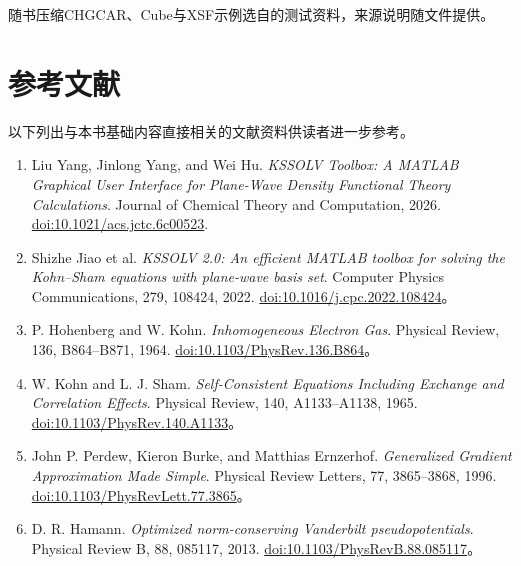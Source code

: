 随书压缩CHGCAR、Cube与XSF示例选自的测试资料，来源说明随文件提供。

\section{参考文献}

以下列出与本书基础内容直接相关的文献资料供读者进一步参考。

\begingroup
\small
\RaggedRight
\begin{enumerate}[itemsep=4pt]
\item Liu Yang, Jinlong Yang, and Wei Hu. \textit{KSSOLV Toolbox: A MATLAB\regmark{} Graphical User Interface for Plane-Wave Density Functional Theory Calculations}. Journal of Chemical Theory and Computation, 2026. \href{https://doi.org/10.1021/acs.jctc.6c00523}{doi:10.1021/acs.jctc.6c00523}.
\item Shizhe Jiao et al. \textit{KSSOLV 2.0: An efficient MATLAB\regmark{} toolbox for solving the Kohn--Sham equations with plane-wave basis set}. Computer Physics Communications, 279, 108424, 2022. \href{https://doi.org/10.1016/j.cpc.2022.108424}{doi:10.1016/j.cpc.2022.108424}。
\item P. Hohenberg and W. Kohn. \textit{Inhomogeneous Electron Gas}. Physical Review, 136, B864--B871, 1964. \href{https://doi.org/10.1103/PhysRev.136.B864}{doi:10.1103/PhysRev.136.B864}。
\item W. Kohn and L. J. Sham. \textit{Self-Consistent Equations Including Exchange and Correlation Effects}. Physical Review, 140, A1133--A1138, 1965. \href{https://doi.org/10.1103/PhysRev.140.A1133}{doi:10.1103/PhysRev.140.A1133}。
\item John P. Perdew, Kieron Burke, and Matthias Ernzerhof. \textit{Generalized Gradient Approximation Made Simple}. Physical Review Letters, 77, 3865--3868, 1996. \href{https://doi.org/10.1103/PhysRevLett.77.3865}{doi:10.1103/PhysRevLett.77.3865}。
\item D. R. Hamann. \textit{Optimized norm-conserving Vanderbilt pseudopotentials}. Physical Review B, 88, 085117, 2013. \href{https://doi.org/10.1103/PhysRevB.88.085117}{doi:10.1103/PhysRevB.88.085117}。
\end{enumerate}

\endgroup
